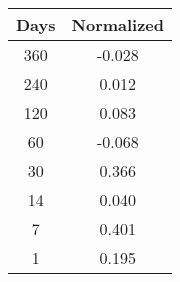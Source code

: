 \begin{tabular}{||c c||}
\hline
Days & Normalized \\
\hline\hline
360 & -0.028 \\
240 & 0.012 \\
120 & 0.083 \\
60 & -0.068 \\
30 & 0.366 \\
14 & 0.040 \\
7 & 0.401 \\
1 & 0.195 \\
\hline
\end{tabular}
